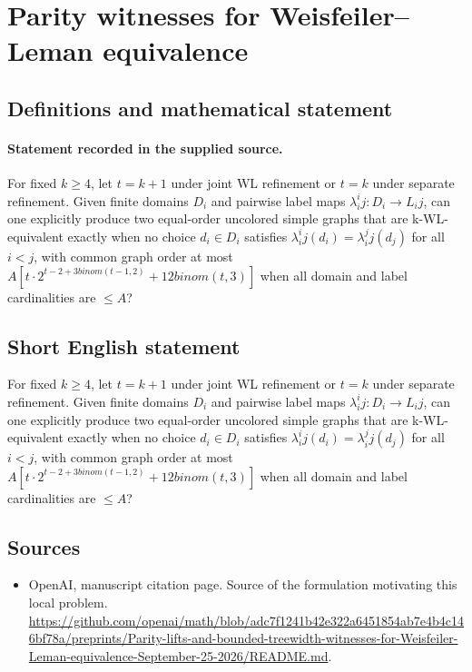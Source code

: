 \documentclass[11pt]{article}
\begin{document}
\section*{Parity witnesses for Weisfeiler–Leman equivalence}\label{30007498}
\subsection{Definitions and mathematical statement}
\paragraph{Statement recorded in the supplied source.}
For fixed $k\geq 4$, let $t=k+1$ under joint WL refinement or $t=k$ under separate refinement. Given finite domains $D_i$ and pairwise label maps $\lambda ^i_ij:D_i\to L_ij$, can one explicitly produce two equal-order uncolored simple graphs that are k-WL-equivalent exactly when no choice $d_i\in D_i$ satisfies $\lambda ^i_ij(d_i)=\lambda ^j_ij(d_j)$ for all $i<j$, with common graph order at most $A[t\cdot 2^{t-2+3binom(t-1,2)}+12binom(t,3)]$ when all domain and label cardinalities are $\leq A$?
\subsection{Short English statement}
For fixed $k\geq 4$, let $t=k+1$ under joint WL refinement or $t=k$ under separate refinement. Given finite domains $D_i$ and pairwise label maps $\lambda ^i_ij:D_i\to L_ij$, can one explicitly produce two equal-order uncolored simple graphs that are k-WL-equivalent exactly when no choice $d_i\in D_i$ satisfies $\lambda ^i_ij(d_i)=\lambda ^j_ij(d_j)$ for all $i<j$, with common graph order at most $A[t\cdot 2^{t-2+3binom(t-1,2)}+12binom(t,3)]$ when all domain and label cardinalities are $\leq A$?
\subsection{Sources}
\begin{itemize}
\item[S1] OpenAI, manuscript citation page. Source of the formulation motivating this local problem.
\url{https://github.com/openai/math/blob/adc7f1241b42e322a6451854ab7e4b4c146bf78a/preprints/Parity-lifts-and-bounded-treewidth-witnesses-for-Weisfeiler-Leman-equivalence-September-25-2026/README.md}.
\end{itemize}
\end{document}

